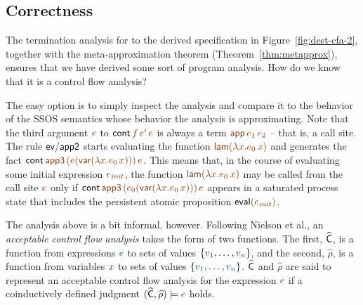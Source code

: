 \subsection{Correctness}

The termination analysis for to the derived specification in
Figure~\ref{fig:dest-cfa-2}, together with the meta-approximation
theorem (Theorem~\ref{thm:metapprox}), ensures that we have derived
some sort of program analysis. How do we know that it is a control 
flow analysis? 

The easy option is to simply inspect the analysis and compare it to
the behavior of the SSOS semantics whose behavior the analysis is
approximating.  Note that the third argument $\lf{e}$ to ${\sf
  cont}\,\lf{f}\,\lf{e'}\,\lf{e}$ is always a term $\lf{{\sf
    app}\,e_1\,e_2}$ -- that is, a call site. The rule ${\sf ev/app2}$
starts evaluating the function $\lf{{\sf lam}(\lambda x.e_0\,x)}$ and
generates the fact ${\sf cont}\,\lf{\sf app3}\,\lf{(e({\sf
    var}(\lambda x.e_0\,x)))}\,\lf{e}$. This means that, in the course
of evaluating some initial expression $\lf{e_{\it init}}$, the
function $\lf{{\sf lam}(\lambda x.e_0\,x)}$ may be called from the
call site $\lf{e}$ only if ${\sf cont}\,\lf{\sf app3}\,\lf{(e_0({\sf
    var}(\lambda x.e_0\,x)))}\,\lf{e}$ appears in a saturated process
state that includes the persistent atomic proposition ${\sf
  eval}\lf{(e_{\it init})}$.


The analysis above is a bit informal, however. Following Nielson et
al., an {\it acceptable control flow analysis} takes the form of two
functions. The first, $\widehat{\sf C}$, is a function from
expressions $\obj{e}$ to sets of values $\{\obj{v_1},
\ldots,\obj{v_n}\}$, and the second, $\widehat{\rho}$, is a function
from variables $\obj{x}$ to sets of values $\{\obj{v_1},
\ldots,\obj{v_n}\}$. $\widehat{\sf C}$ and $\widehat{\rho}$ are said
to represent an acceptable control flow analysis for the expression
$\obj{e}$ if a coinductively defined judgment $(\widehat{\sf
  C},\widehat{\rho}) \models \obj{e}$ holds.

